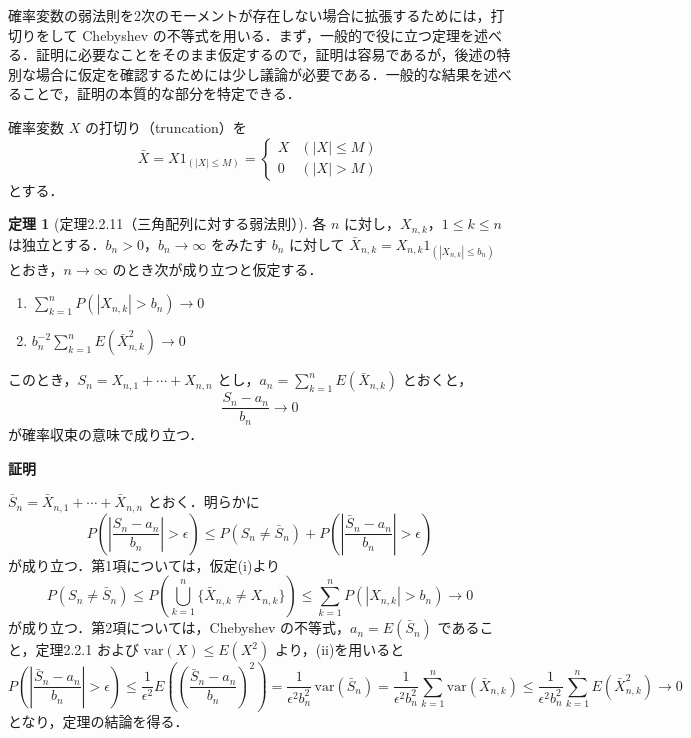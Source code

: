 \documentclass[dvipdfmx]{jsarticle}
\makeatletter
\numberwithin{equation}{section}
\theoremstyle{definition}
\newtheorem{thm}{定理}[section]
\renewenvironment{proof}[1][\proofname]{\par
  \pushQED{\qed}%
  \normalfont \topsep6\p@\@plus6\p@\relax
  \trivlist
  \item\relax
  {\bfseries
  #1\@addpunct{.}}\hspace\labelsep\ignorespaces
}{%
  \popQED\endtrivlist\@endpefalse
}
\renewcommand{\proofname}{証明}
\newcommand{\0}{\bm{0}}
\newcommand{\1}{\bm{1}}
\makeatother
\begin{document}
確率変数の弱法則を2次のモーメントが存在しない場合に拡張するためには，打切りをして Chebyshev の不等式を用いる．まず，一般的で役に立つ定理を述べる．証明に必要なことをそのまま仮定するので，証明は容易であるが，後述の特別な場合に仮定を確認するためには少し議論が必要である．一般的な結果を述べることで，証明の本質的な部分を特定できる．

確率変数 $X$ の打切り（truncation）を
\[
  \bar{X} = X 1_{(|X| \le M)} =
  \begin{cases}
    X & (|X| \le M) \\
    0 & (|X| > M)
  \end{cases}
\]
とする．

\begin{thm}[定理2.2.11（三角配列に対する弱法則）]
各 $n$ に対し，$X_{n,k}$，$1 \le k \le n$ は独立とする．$b_n > 0$，$b_n \to \infty$ をみたす $b_n$ に対して $\bar{X}_{n,k} = X_{n,k} 1_{(|X_{n,k}| \le b_n)}$ とおき，$n \to \infty$ のとき次が成り立つと仮定する．
\begin{enumerate}
  \item[(i)] $\displaystyle \sum_{k=1}^n P(|X_{n,k}| > b_n) \to 0$
  \item[(ii)] $\displaystyle b_n^{-2} \sum_{k=1}^n E(\bar{X}_{n,k}^2) \to 0$
\end{enumerate}
このとき，$S_n = X_{n,1} + \cdots + X_{n,n}$ とし，$a_n = \sum_{k=1}^n E(\bar{X}_{n,k})$ とおくと，
\[
  \frac{S_n - a_n}{b_n} \to 0
\]
が確率収束の意味で成り立つ．
\end{thm}

\begin{proof}
$\bar{S}_n = \bar{X}_{n,1} + \cdots + \bar{X}_{n,n}$ とおく．明らかに
\[
  P\!\left(\left|\frac{S_n - a_n}{b_n}\right| > \epsilon\right)
  \le P(S_n \ne \bar{S}_n) + P\!\left(\left|\frac{\bar{S}_n - a_n}{b_n}\right| > \epsilon\right)
\]
が成り立つ．第1項については，仮定(i)より
\[
  P(S_n \ne \bar{S}_n)
  \le P\!\left(\bigcup_{k=1}^n \{\bar{X}_{n,k} \ne X_{n,k}\}\right)
  \le \sum_{k=1}^n P(|X_{n,k}| > b_n) \to 0
\]
が成り立つ．第2項については，Chebyshev の不等式，$a_n = E(\bar{S}_n)$ であること，定理2.2.1 および $\mathrm{var}(X) \le E(X^2)$ より，(ii)を用いると
\[
  P\!\left(\left|\frac{\bar{S}_n - a_n}{b_n}\right| > \epsilon\right)
  \le \frac{1}{\epsilon^2} E\!\left(\left(\frac{\bar{S}_n - a_n}{b_n}\right)^2\right)
  = \frac{1}{\epsilon^2 b_n^2}\, \mathrm{var}(\bar{S}_n)
  = \frac{1}{\epsilon^2 b_n^2} \sum_{k=1}^n \mathrm{var}(\bar{X}_{n,k})
  \le \frac{1}{\epsilon^2 b_n^2} \sum_{k=1}^n E(\bar{X}_{n,k}^2) \to 0
\]
となり，定理の結論を得る．
\end{proof}
\end{document}
